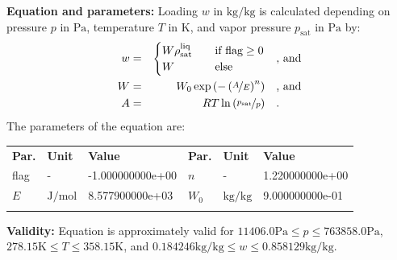 \textbf{Equation and parameters:}
\newline
%
Loading $w$ in $\si{\kilogram\per\kilogram}$ is calculated depending on pressure $p$ in $\si{\pascal}$, temperature $T$ in $\si{\kelvin}$, and vapor pressure $p_\mathrm{sat}$ in $\si{\pascal}$ by:
%
\begin{equation*}
\begin{split}
w &=& \begin{cases} W \rho_\mathrm{sat}^{\mathrm{liq}} & \quad \text{if flag} \geq 0 \\ W & \quad \text{else} \end{cases} & \quad\text{, and} \\
W &=& W_0 \exp \left( - \left( \nicefrac{A}{E} \right) ^{n} \right) & \quad\text{, and} \\
A &=& R T \ln \left( \nicefrac{p_\mathrm{sat}}{p} \right) & \quad\text{.} \\
\end{split}
\end{equation*}
%
The parameters of the equation are:
%
\begin{longtable}[l]{lll|lll}
\toprule
\addlinespace
\textbf{Par.} & \textbf{Unit} & \textbf{Value} &	\textbf{Par.} & \textbf{Unit} & \textbf{Value} \\
\addlinespace
\midrule
\endhead

\bottomrule
\endfoot
\bottomrule
\endlastfoot
\addlinespace

flag & - & -1.000000000e+00 & $n$ & - & 1.220000000e+00 \\
$E$ & $\si{\joule\per\mole}$ & 8.577900000e+03 & $W_0$ & $\si{\kilogram\per\kilogram}$ & 9.000000000e-01 \\

\addlinespace\end{longtable}

\textbf{Validity:}
\newline
Equation is approximately valid for $11406.0 \si{\pascal} \leq p \leq 763858.0 \si{\pascal}$,  $278.15 \si{\kelvin} \leq T \leq 358.15 \si{\kelvin}$, and $0.184246 \si{\kilogram\per\kilogram} \leq w \leq 0.858129 \si{\kilogram\per\kilogram}$.
\newline

